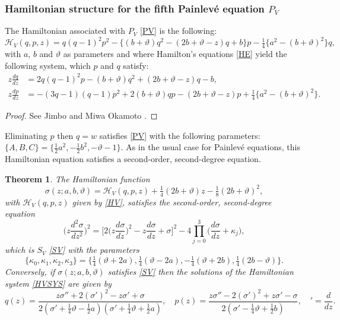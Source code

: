 \documentclass[12pt]{article}
\def\P{Painlev\'e }
\newtheorem{mydef}{Theorem}[section]
\numberwithin{figure}{section}
\numberwithin{equation}{section}
\numberwithin{table}{section}
\begin{document}
\subsubsection{Hamiltonian structure for the fifth \P equation  $P_{V}$}
The Hamiltonian associated with $P_{V}$ \eqref{PV} is the following:
\begin{equation}
\mathcal{H}_{V}(q,p,z)=q(q-1)^2p^2-\{(b+\vartheta)q^2-(2b+\vartheta-z)q+b\}p-\tfrac{1}{4}\{a^2-(b+\vartheta)^2\}q,\label{HV}
\end{equation}
with $a$, $b$ and $\vartheta$ as parameters and
where Hamilton's equations \eqref{HE} yield the following system, which $p$ and $q$ satisfy:
\begin{subequations}\label{HVSYS}
\begin{align}
z\frac{dq}{dz}&=2q(q-1)^2p-(b+\vartheta)q^2+(2b+\vartheta-z)q-b,\label{HV1}\\
z\frac{dp}{dz}&=-(3q-1)(q-1)p^2+2(b+\vartheta)qp-(2b+\vartheta-z)p+\tfrac{1}{4}\{a^2-(b+\vartheta)^2\}.\label{HV2}
\end{align}
\end{subequations}
\begin{proof}
See Jimbo and Miwa \cite{P:2:407} Okamoto \cite{P:56:264,P:56:367,P:13:47}.
\end{proof}
Eliminating $p$ then $q=w$ satisfies \eqref{PV} with the following parameters:
$\{A,B,C\}=\{\tfrac{1}{2}{a^2},-\tfrac{1}{2}{b^2},-\vartheta-1\}$.
As in the usual case for \P equations, this Hamiltonian equation satisfies a second-order, second-degree equation.
\begin{mydef} The Hamiltonian function
\begin{equation}
\sigma(z;a,b,\vartheta)=\mathcal{H}_V(q,p,z)+\tfrac{1}{4}(2b+\vartheta)z-\tfrac{1}{8}(2b+\vartheta)^2,\label{sigHv}
\end{equation}
with $\mathcal{H}_V(q,p,z)$ given by \eqref{HV}, satisfies the second-order, second-degree equation
$$
\bigg(z\frac{d^2\sigma}{dz^2}\bigg)^2=\bigg[2\bigg(z\frac{d\sigma}{dz}\bigg)^2-z\frac{d\sigma}{dz}+\sigma\bigg]^2-4\prod_{j=0}^3\bigg(
\frac{d\sigma}{dz}+\kappa_j\bigg),
$$
which is $S_{V}$ \eqref{SV} with the parameters
$$\{\kappa_0,\kappa_1,\kappa_2,\kappa_3\}=\big\{\tfrac{1}{4}(\vartheta+2a),\tfrac{1}{4}(\vartheta-2a),-\tfrac{1}{4}(\vartheta+2b),
\tfrac{1}{4}(2b-\vartheta)\big\}.$$
Conversely, if $\sigma(z;
a,b,\vartheta)$ satisfies \eqref{SV} then the solutions of the Hamiltonian system \eqref{HVSYS} are given by
\begin{equation}\label{PVpandq}
q(z) =\frac { z\sigma''+2(\sigma')^{2}-z\sigma' +\sigma}{ 2(\sigma'+\tfrac{1}{4}\vartheta-\tfrac12a) (\sigma'
+\tfrac{1}{4}\vartheta+\tfrac{1}{2}a)},\quad
p(z) ={\frac { z\sigma''-2(\sigma')^{2}+z\sigma'-\sigma }{ 2(\sigma'-\tfrac{1}{4}\vartheta+\tfrac{1}{2}b)}},\quad'=\frac{d}{dz}.
\end{equation}
\end{mydef}
\end{document}
